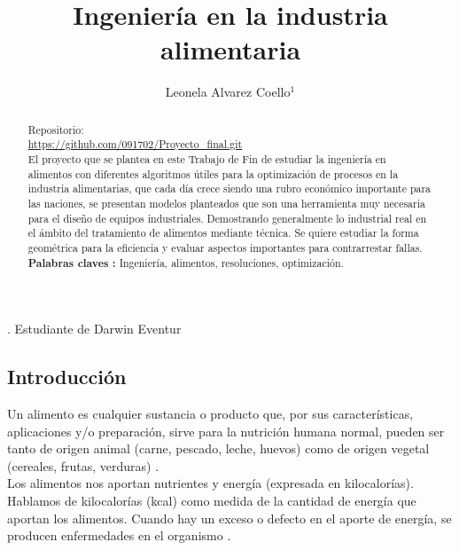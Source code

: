 \documentclass[12pt,a4paper]{article}
\author{Leonela Alvarez Coello$^1$}
\begin{document}
\title{Ingeniería en la industria alimentaria}
.  Estudiante de Darwin Eventur 


\begin{abstract}
Repositorio:\\
\url{https://github.com/091702/Proyecto_final.git}\\

El proyecto que se plantea en este Trabajo de Fin de estudiar la ingeniería en alimentos con diferentes algoritmos útiles para la optimización de procesos en la industria alimentarias, que cada día crece siendo una rubro económico importante para las naciones, se presentan  modelos planteados que son una herramienta muy necesaria para el diseño de equipos industriales. Demostrando  generalmente lo industrial real en el ámbito del tratamiento de alimentos mediante técnica. Se quiere estudiar la forma geométrica para la eficiencia y evaluar aspectos importantes para contrarrestar fallas.\\

\textbf{Palabras claves :} Ingeniería, alimentos, resoluciones, optimización. 
\end{abstract}


\newpage

\renewcommand{\contentsname}{Índice}
\tableofcontents
\newpage
\pagestyle{fancy}
\fancyhead{} 
\renewcommand{\headrulewidth}{0.25pt} 

\begin{center}
\section{Introducción}
\end{center}
Un alimento es cualquier sustancia o producto que, por sus características, aplicaciones y/o preparación, sirve para la nutrición humana normal, pueden ser tanto de origen animal (carne, pescado, leche, huevos) como de origen vegetal (cereales, frutas, verduras) \cite{Luzt1979}. \\

Los alimentos nos aportan nutrientes y energía (expresada en kilocalorías). Hablamos de kilocalorías (kcal) como medida de la cantidad de energía que aportan los alimentos. Cuando hay un exceso o defecto en el aporte de energía, se producen enfermedades en el organismo \cite{Rosenauer2002}. \\
\end{document}
